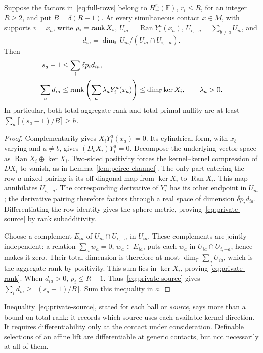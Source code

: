 \begin{theorem}\label{thm:private}
Suppose the factors in~\eqref{eq:full-rows} belong to
$H_+^{r_i}(\mathbb F)$, $r_i\leq R$, for an integer $R\geq2$, and put
$B=\delta(R-1)$.
At every simultaneous contact $x\in M$, with supports $v=x_a$, write
$p_i=\operatorname{rank} X_i$,
$U_{ia}=\operatorname{Ran}Y_i^a(x_a)$,
$U_{i,-a}=\sum_{b\ne a}U_{ib}$, and
\[
 d_{ia}=\dim_\mathbb F U_{ia}/(U_{ia}\cap U_{i,-a}).
\]
Then
\begin{align}
 s_a-1&\leq\sum_i\delta p_i d_{ia},\label{eq:private-source}\\
 \sum_a d_{ia}&\leq\operatorname{rank}\left(\sum_a\lambda_aY_i^a(x_a)\right)
 \leq\dim_\mathbb F\ker X_i,\qquad\lambda_a>0.
 \label{eq:private-rank}
\end{align}
In particular, both total aggregate rank and total primal nullity are at
least $\sum_a\lceil(s_a-1)/B\rceil\geq h$.
\end{theorem}
\begin{proof}
Complementarity gives $X_iY_i^a(x_a)=0$. Its cylindrical form, with
$x_b$ varying and $a\ne b$, gives $(D_bX_i)Y_i^a=0$.
Decompose the underlying vector space as $\operatorname{Ran}X_i\oplus
\ker X_i$. Two-sided positivity forces the kernel--kernel compression
of $DX_i$ to vanish, as in Lemma~\ref{lem:peirce-channel}. The only
part entering the row-$a$ mixed pairing is its off-diagonal map from
$\ker X_i$ to $\operatorname{Ran}X_i$. This map annihilates $U_{i,-a}$.
The corresponding derivative of $Y_i^a$ has its other endpoint in
$U_{ia}$; the derivative pairing therefore factors through a real
space of dimension $\delta p_i d_{ia}$. Differentiating the row identity
gives the sphere metric, proving~\eqref{eq:private-source} by rank
subadditivity.

Choose a complement $E_{ia}$ of $U_{ia}\cap U_{i,-a}$ in $U_{ia}$.
These complements are jointly independent: a relation
$\sum_aw_a=0$, $w_a\in E_{ia}$, puts each $w_a$ in
$U_{ia}\cap U_{i,-a}$, hence makes it zero. Their total dimension is
therefore at most $\dim_\mathbb F\sum_aU_{ia}$, which is the aggregate
rank by positivity. This sum lies in $\ker X_i$, proving
\eqref{eq:private-rank}. When $d_{ia}>0$, $p_i\leq R-1$.
Thus~\eqref{eq:private-source} gives
$\sum_i d_{ia}\geq\lceil(s_a-1)/B\rceil$. Sum this inequality in $a$.
\end{proof}

Inequality~\eqref{eq:private-source}, stated for each ball or
\emph{source}, says more than a bound on total rank: it records which
source uses each available kernel direction. It requires
differentiability only at the contact under consideration. Definable
selections of an affine lift are differentiable at generic contacts, but
not necessarily at all of them.

